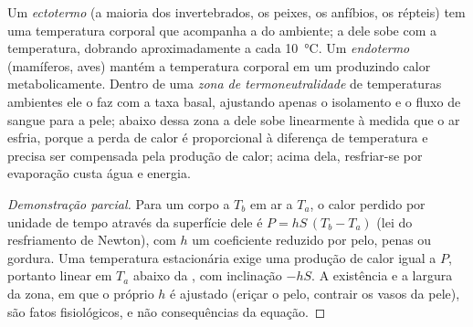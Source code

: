 \begin{proposition}\label{prop:b1:organism-environment:thermo}
Um \emph{ectotermo} (a maioria dos invertebrados, os
peixes, os anfíbios, os répteis) tem uma temperatura corporal que
acompanha a do ambiente; a  dele sobe com a temperatura,
dobrando aproximadamente a cada \qty{10}{\celsius}. Um
\emph{endotermo} (mamíferos, aves) mantém a
temperatura corporal em um  produzindo calor
metabolicamente. Dentro de uma
\emph{zona de termoneutralidade} de
temperaturas ambientes ele o faz com a taxa basal, ajustando apenas o
isolamento e o fluxo de sangue para a pele; abaixo dessa zona a  dele sobe linearmente à medida que o ar esfria, porque a
perda de calor é proporcional à diferença de temperatura e precisa ser
compensada pela produção de calor; acima dela, resfriar-se por
evaporação custa água e energia.
\end{proposition}
\begin{proof}[Demonstração parcial]
Para um corpo a $T_b$ em ar a $T_a$, o calor perdido por unidade de
tempo através da superfície dele é $P = hS\,(T_b - T_a)$ (lei do
resfriamento de Newton), com $h$ um coeficiente reduzido por pelo, penas
ou gordura. Uma temperatura estacionária exige uma produção de calor
igual a $P$, portanto linear em $T_a$ abaixo da , com inclinação $-hS$. A existência e a largura da
zona, em que o próprio $h$ é ajustado (eriçar o pelo, contrair os vasos
da pele), são fatos fisiológicos, e não consequências da equação.
\end{proof}

